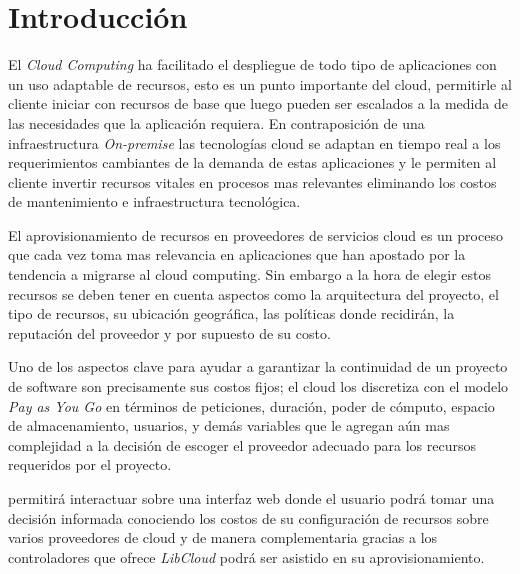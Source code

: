 \chapter{Introducción} %

\label{ch:introduccion} %



El \textit{Cloud Computing} ha facilitado el despliegue de todo tipo de aplicaciones con un uso adaptable de recursos, esto es un punto importante del cloud, permitirle al cliente iniciar con recursos de base que luego pueden ser escalados a la medida de las necesidades que la aplicación requiera. En contraposición de una infraestructura \textit{On-premise} las tecnologías cloud se adaptan en tiempo real a los requerimientos cambiantes de la demanda de estas aplicaciones y le permiten al cliente invertir recursos vitales en procesos mas relevantes eliminando los costos de mantenimiento e infraestructura tecnológica.\bigskip

El aprovisionamiento de recursos en proveedores de servicios cloud es un proceso que cada vez toma mas relevancia en aplicaciones que han apostado por la tendencia a migrarse al cloud computing. Sin embargo a la hora de elegir estos recursos se deben tener en cuenta aspectos como la arquitectura del proyecto, el tipo de recursos, su ubicación geográfica, las políticas donde recidirán, la reputación del proveedor y por supuesto de su costo.\bigskip

Uno de los aspectos clave para ayudar a garantizar la continuidad de un proyecto de software son precisamente sus costos fijos; el cloud los discretiza con el modelo \textit{Pay as You Go} en términos de peticiones, duración, poder de cómputo, espacio de almacenamiento, usuarios, y demás variables que le agregan aún mas complejidad a la decisión de escoger el proveedor adecuado para los recursos requeridos por el proyecto. \bigskip

\appName permitirá interactuar sobre una interfaz web donde el usuario podrá tomar una decisión informada conociendo los costos de su configuración de recursos sobre varios proveedores de cloud y de manera complementaria gracias a los controladores que ofrece \textit{LibCloud} podrá ser asistido en su aprovisionamiento.\bigskip